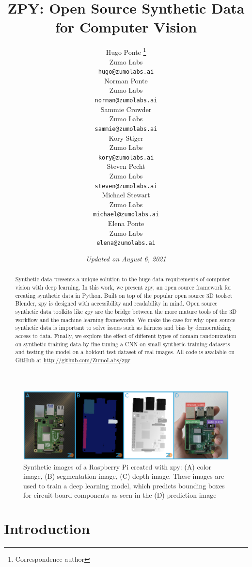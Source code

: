 \documentclass{article}
\title{ZPY: Open Source Synthetic Data for Computer Vision}
\author{
	{\hspace{1mm}Hugo Ponte} \footnote{Correspondence author} \\ 
	Zumo Labs \\
	\texttt{hugo@zumolabs.ai} \\
	\And
	{\hspace{1mm}Norman Ponte} \\
	Zumo Labs \\
	\texttt{norman@zumolabs.ai} \\
	\And
	{\hspace{1mm}Sammie Crowder} \\
	Zumo Labs \\
	\texttt{sammie@zumolabs.ai} \\
	\And
	{\hspace{1mm}Kory Stiger} \\
	Zumo Labs \\
	\texttt{kory@zumolabs.ai} \\
	\And
	{\hspace{1mm}Steven Pecht} \\
	Zumo Labs \\
	\texttt{steven@zumolabs.ai} \\
	\And
	{\hspace{1mm}Michael Stewart} \\
	Zumo Labs \\
	\texttt{michael@zumolabs.ai} \\
	\And
	{\hspace{1mm}Elena Ponte} \\
	Zumo Labs \\
	\texttt{elena@zumolabs.ai} \\
}
\date{\emph{Updated on August 6, 2021}}
\begin{document}
\maketitle

\begin{abstract}
Synthetic data presents a unique solution to the huge data requirements of computer vision with deep learning. In this work, we present zpy, an open source framework for creating synthetic data in Python. Built on top of the popular open source 3D toolset Blender, zpy is designed with accessibility and readability in mind. Open source synthetic data toolkits like zpy are the bridge between the more mature tools of the 3D workflow and the machine learning frameworks. We make the case for why open source synthetic data is important to solve issues such as fairness and bias by democratizing access to data. Finally, we explore the effect of different types of domain randomization on synthetic training data by fine tuning a CNN on small synthetic training datasets and testing the model on a holdout test dataset of real images. All code is available on GitHub at \url{http://github.com/ZumoLabs/zpy}
\end{abstract}


\begin{figure}[!ht]
	\centering
	\includegraphics[width=\textwidth]{cover.png}
	\caption{Synthetic images of a Raspberry Pi created with zpy: (A) color image, (B) segmentation image, (C) depth image. These images are used to train a deep learning model, which predicts bounding boxes for circuit board components as seen in the (D) prediction image}
	\label{fig:fig1}
\end{figure}

\section{Introduction}
\label{sec:introduction}
\end{document}

